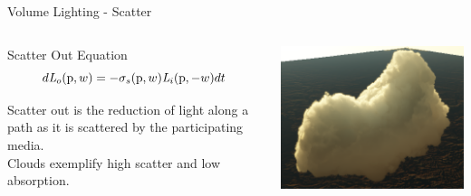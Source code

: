 \documentclass[10pt,compress,professionalfont]{beamer}
\begin{document}
\begin{frame}{Volume Lighting - Scatter}

    \begin{columns}
        \begin{column}{0.55\textwidth}

            \begin{block}{Scatter Out Equation}
                \[
                    d\mathit{L}_{o}(\textup{p},w) = -\sigma_{s}(\textup{p},w) \mathit{L}_{i}(\textup{p},-w)dt
                \]
            \end{block}
            \vspace{8mm}
            Scatter out is the reduction of light along a path as it is scattered by the participating media.\\
            \vspace{8mm}
            Clouds exemplify high scatter and low absorption.

        \end{column}
        \begin{column}{0.45\textwidth}
            \vspace{10mm}
            \includegraphics[width=\textwidth]{../img/external/cloud}\\
        \end{column}
    \end{columns}

\end{frame}
\end{document}
